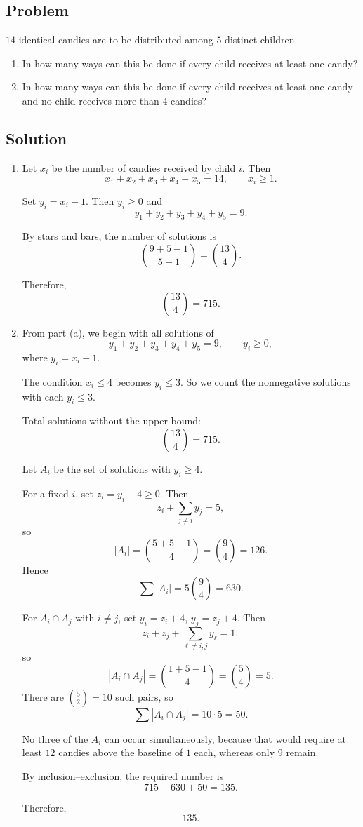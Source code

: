 \documentclass[12pt]{article}
\begin{document}
\subsection{Problem}

$14$ identical candies are to be distributed among $5$ distinct children.

\begin{enumerate}[label=(\alph*)]
    \item In how many ways can this be done if every child receives at least one candy?
    \item In how many ways can this be done if every child receives at least one candy and no child receives more than $4$ candies?
\end{enumerate}

\subsection{Solution}

\begin{enumerate}[label=(\alph*)]
    \item Let $x_i$ be the number of candies received by child $i$. Then
    \[
    x_1+x_2+x_3+x_4+x_5=14,
    \qquad x_i\ge 1.
    \]

    Set $y_i=x_i-1$. Then $y_i\ge 0$ and
    \[
    y_1+y_2+y_3+y_4+y_5=9.
    \]

    By stars and bars, the number of solutions is
    \[
    \binom{9+5-1}{5-1}=\binom{13}{4}.
    \]

    Therefore,
    \[
    \boxed{\binom{13}{4}=715}.
    \]

    \item From part (a), we begin with all solutions of
    \[
    y_1+y_2+y_3+y_4+y_5=9,
    \qquad y_i\ge 0,
    \]
    where $y_i=x_i-1$.

    The condition $x_i\le 4$ becomes $y_i\le 3$. So we count the nonnegative solutions with each $y_i\le 3$.

    Total solutions without the upper bound:
    \[
    \binom{13}{4}=715.
    \]

    Let $A_i$ be the set of solutions with $y_i\ge 4$.

    For a fixed $i$, set $z_i=y_i-4\ge 0$. Then
    \[
    z_i+\sum_{j\ne i} y_j=5,
    \]
    so
    \[
    |A_i|=\binom{5+5-1}{4}=\binom{9}{4}=126.
    \]
    Hence
    \[
    \sum |A_i|=5\binom{9}{4}=630.
    \]

    For $A_i\cap A_j$ with $i\ne j$, set $y_i=z_i+4$, $y_j=z_j+4$. Then
    \[
    z_i+z_j+\sum_{\ell\ne i,j} y_\ell =1,
    \]
    so
    \[
    |A_i\cap A_j|=\binom{1+5-1}{4}=\binom{5}{4}=5.
    \]
    There are $\binom{5}{2}=10$ such pairs, so
    \[
    \sum |A_i\cap A_j|=10\cdot 5=50.
    \]

    No three of the $A_i$ can occur simultaneously, because that would require at least $12$ candies above the baseline of $1$ each, whereas only $9$ remain.

    By inclusion--exclusion, the required number is
    \[
    715-630+50=135.
    \]

    Therefore,
    \[
    \boxed{135}.
    \]
\end{enumerate}
\end{document}
